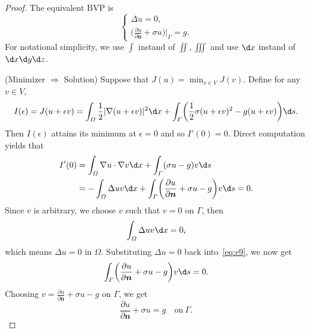 \begin{proof}
  The equivalent BVP is
  \[\begin{cases}
    \Delta u = 0, \\
    \bigl(\frac{\partial u}{\partial \bm{n}} + \sigma u\bigr)\big|_{\varGamma} = g.
  \end{cases}\]
  For notational simplicity, we use $\int$ instand of $\iint,\iiint$ and use $\d x$
  instand of $\d x\d y\d z$.

  (Minimizer $\Rightarrow$ Solution) Suppose that $J(u) = \min_{v\in V} J(v)$.
  Define for any $v\in V$,
  \begin{equation}\label{eq:e8}
    I(\epsilon) = J(u+\epsilon v)
      = \int_\varOmega \frac12 |\nabla(u+\epsilon v)|^2 \d x
        + \int_\varGamma \biggl(\frac12 \sigma (u+\epsilon v)^2 - g(u+\epsilon v)\biggr) \d s.
  \end{equation}
  Then $I(\epsilon)$ attains its minimum at $\epsilon=0$ and so $I'(0)=0$.
  Direct computation yields that
  \begin{equation}\label{eq:e9}
    \begin{aligned}
      I'(0)
      & = \int_\varOmega \nabla u\cdot \nabla v \d x + \int_\varGamma (\sigma u-g)v \d s \\
      & = - \int_\varOmega \Delta u v \d x
          + \int_\varGamma \biggl(\frac{\partial u}{\partial \bm{n}} + \sigma u - g\biggr)v \d s = 0.
    \end{aligned}
  \end{equation}
  Since $v$ is arbitrary, we choose $v$ such that $v=0$ on $\varGamma$, then
  \begin{equation}\label{eq:e10}
    \int_\varOmega \Delta u v \d x = 0,
  \end{equation}
  which means $\Delta u = 0$ in $\varOmega$. Substituting $\Delta u = 0$ back into~\eqref{eq:e9},
  we now get
  \begin{equation}\label{eq:e11}
    \int_\varGamma \biggl(\frac{\partial u}{\partial \bm{n}} + \sigma u - g\biggr)v \d s = 0.
  \end{equation}
  Choosing $v = \frac{\partial u}{\partial \bm{n}} + \sigma u - g$ on $\varGamma$, we get
  \[ \frac{\partial u}{\partial \bm{n}} + \sigma u = g \quad \text{on}\ \varGamma. \]


\end{proof}
